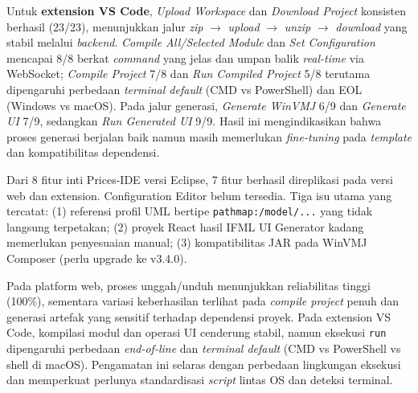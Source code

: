\documentclass[12pt,a4paper,onecolumn]{article}
\newcommand{\f}[1]{\textit{#1}}
\begin{document}
Untuk \textbf{extension VS Code}, \textit{Upload Workspace} dan \textit{Download Project} konsisten berhasil (23/23), menunjukkan jalur  \textit{zip} $\rightarrow$ \textit{upload} $\rightarrow$ \textit{unzip} $\rightarrow$ \textit{download} yang stabil melalui \textit{backend}. \textit{Compile All/Selected Module} dan \textit{Set Configuration} mencapai 8/8 berkat \textit{command} yang jelas dan umpan balik \textit{real-time} via WebSocket; \textit{Compile Project} 7/8 dan \textit{Run Compiled Project} 5/8 terutama dipengaruhi perbedaan \textit{terminal default} (CMD vs PowerShell) dan EOL (Windows vs macOS). Pada jalur generasi, \textit{Generate WinVMJ} 6/9 dan \textit{Generate UI} 7/9, sedangkan \textit{Run Generated UI} 9/9. Hasil ini mengindikasikan bahwa proses generasi berjalan baik namun masih memerlukan \textit{fine-tuning} pada \textit{template} dan kompatibilitas dependensi.

Dari 8 fitur inti Prices-IDE versi Eclipse, 7 fitur berhasil direplikasi pada versi web dan extension. Configuration Editor belum tersedia. Tiga isu utama yang tercatat: (1) referensi profil UML bertipe \texttt{pathmap:/model/...} yang tidak langsung terpetakan; (2) proyek React hasil IFML UI Generator kadang memerlukan penyesuaian manual; (3) kompatibilitas JAR pada WinVMJ Composer (perlu upgrade ke v3.4.0).

Pada platform web, proses unggah/unduh menunjukkan reliabilitas tinggi (100\%), sementara variasi keberhasilan terlihat pada \f{compile project} penuh dan generasi artefak yang sensitif terhadap dependensi proyek. Pada extension VS Code, kompilasi modul dan operasi UI cenderung stabil, namun eksekusi \texttt{run} dipengaruhi perbedaan \f{end-of-line} dan \textit{terminal default} (CMD vs PowerShell vs shell di macOS). Pengamatan ini selaras dengan perbedaan lingkungan eksekusi dan memperkuat perlunya standardisasi \textit{script} lintas OS dan deteksi terminal.
\end{document}

